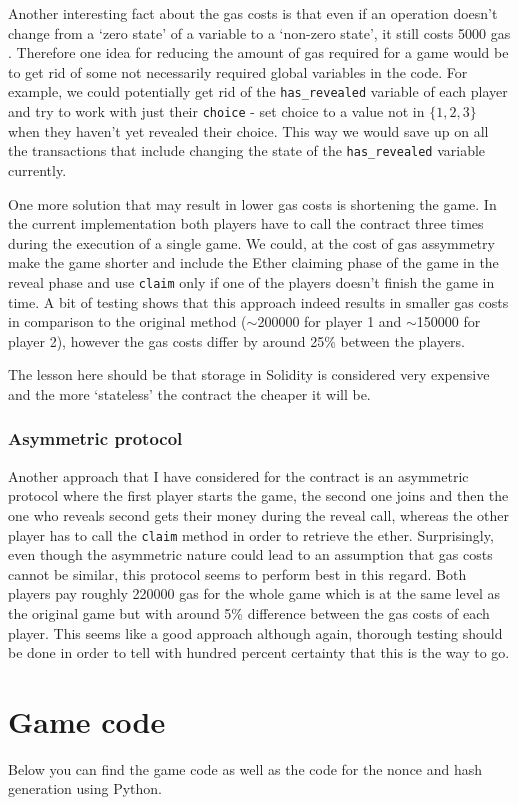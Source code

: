 \documentclass{article}
\begin{document}
    \noindent Another interesting fact about the gas costs
    is that even if an operation doesn't change from a `zero
    state' of a variable to a `non-zero state', it still
    costs 5000 gas \cite{ypaper}. Therefore one idea for
    reducing the amount of gas required for a game would be
    to get rid of some not necessarily required global
    variables in the code. For example, we could potentially
    get rid of the \verb|has_revealed| variable of each
    player and try to work with just their \verb|choice| -
    set choice to a value not in \(\{1,2,3\}\) when they
    haven't yet revealed their choice. This way we would
    save up on all the transactions that include changing
    the state of the \verb|has_revealed| variable currently.
    \newline

    \noindent One more solution that may result in lower gas
    costs is shortening the game. In the current
    implementation both players have to call the contract
    three times during the execution of a single game. We
    could, at the cost of gas assymmetry make the game
    shorter and include the Ether claiming phase of the game
    in the reveal phase and use \verb|claim| only if one of
    the players doesn't finish the game in time. A bit of
    testing shows that this approach indeed results in
    smaller gas costs in comparison to the original method
    (\(\sim\)200000 for player 1 and \(\sim\)150000 for
    player 2), however the gas costs differ by around 25\%
    between the players.
    \newline

    \noindent The lesson here should be that storage in
    Solidity is considered very expensive and the more
    `stateless' the contract the cheaper it will be.

    \subsubsection{Asymmetric protocol}
    Another approach that I have considered for the contract
    is an asymmetric protocol where the first player starts
    the game, the second one joins and then the one who
    reveals second gets their money during the reveal call,
    whereas the other player has to call the \verb|claim|
    method in order to retrieve the ether. Surprisingly,
    even though the asymmetric nature could lead to an
    assumption that gas costs cannot be similar, this
    protocol seems to perform best in this regard. Both
    players pay roughly 220000 gas for the whole game which
    is at the same level as the original game but with
    around 5\% difference between the gas costs of each
    player. This seems like a good approach although again,
    thorough testing should be done in order to tell with
    hundred percent certainty that this is the way to go.

    \section{Game code}
    Below you can find the game code as well as the code for
    the nonce and hash generation using Python.
\end{document}
